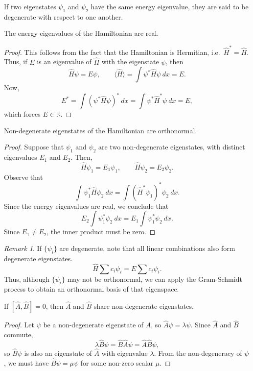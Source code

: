 \documentclass[11pt]{article}
\def\R{\mathbb{R}}
\newcommand\E[1]{\langle #1 \rangle}
\theoremstyle{definition}
\theoremstyle{remark}
\newtheorem*{remark}{Remark}
\numberwithin{equation}{section}
\begin{document}
    \begin{definition}
        If two eigenstates $\psi_1$ and $\psi_2$ have the same energy eigenvalue,
        they are said to be degenerate with respect to one another.
    \end{definition}

    \begin{theorem}
        The energy eigenvalues of the Hamiltonian are real.
    \end{theorem}
    \begin{proof}
        This follows from the fact that the Hamiltonian is Hermitian, i.e.\
        $\hat{H}^* = \hat{H}$. Thus, if $E$ is an eigenvalue of $\hat{H}$ with
        the eigenstate $\psi$, then \[
            \hat{H}\psi = E\psi, \qquad \E{\hat{H}} = \int \psi^*\hat{H}\psi\:dx =
            E.
        \] Now, \[
            E^* = \int (\psi^*\hat{H}\psi)^*\:dx = \int \psi^*\hat{H}^*\psi\:dx = E,
        \] which forces $E \in \R$.
    \end{proof}

    \begin{theorem}
        Non-degenerate eigenstates of the Hamiltonian are orthonormal.
    \end{theorem}
    \begin{proof}
        Suppose that $\psi_1$ and $\psi_2$ are two non-degenerate eigenstates, with
        distinct eigenvalues $E_1$ and $E_2$. Then, \[
            \hat{H}\psi_1 = E_1\psi_1, \qquad \hat{H}\psi_2 = E_2\psi_2.
        \] Observe that \[
            \int \psi_1^*\hat{H}\psi_2\:dx = \int (\hat{H}^*\psi_1)^*\psi_2\:dx.
        \] Since the energy eigenvalues are real, we conclude that \[
            E_2 \int \psi_1^*\psi_2\:dx = E_1 \int \psi_1^*\psi_2\:dx.
        \] Since $E_1 \neq E_2$, the inner product must be zero.
    \end{proof}
    \begin{remark}
        If $\{\psi_i\}$ are degenerate, note that all linear combinations also form
        degenerate eigenstates. \[
            \hat{H}\sum c_i\psi_i = E\sum c_i\psi_i.
        \] Thus, although $\{\psi_i\}$ may not be orthonormal, we can apply the
        Gram-Schmidt process to obtain an orthonormal basis of that eigenspace.
    \end{remark}

    \begin{theorem}
        If $[\hat{A}, \hat{B}] = 0$, then $\hat{A}$ and $\hat{B}$ share
        non-degenerate eigenstates.
    \end{theorem}
    \begin{proof}
        Let $\psi$ be a non-degenerate eigenstate of $\hat{A}$, so $\hat{A}\psi =
        \lambda \psi$. Since $\hat{A}$ and $\hat{B}$ commute, \[
            \lambda \hat{B}\psi = \hat{B}\hat{A}\psi = \hat{A}\hat{B}\psi,
        \] so $\hat{B}\psi$ is also an eigenstate of $\hat{A}$ with eigenvalue
        $\lambda$. From the non-degeneracy of $\psi$, we must have $\hat{B}\psi =
        \mu\psi$ for some non-zero scalar $\mu$.
    \end{proof}
    
\end{document}
